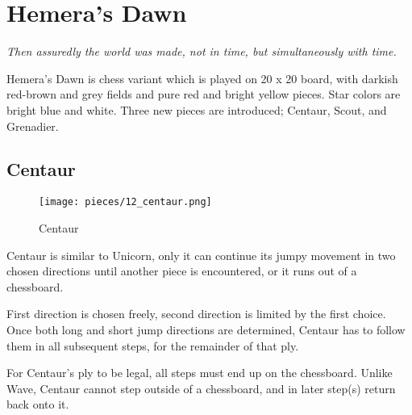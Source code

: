 

\chapter*{Hemera's Dawn}
\label{ch:Hemera's Dawn}

\begin{flushright}
\parbox{0.8\textwidth}{
\emph{Then assuredly the world was made, not in time, but simultaneously with time.\newline
{} } }
\end{flushright}

\noindent
Hemera's Dawn is chess variant which is played on 20 x 20 board, with
darkish red-brown and grey fields and pure red and bright yellow pieces.
Star colors are bright blue and white.
Three new pieces are introduced; Centaur, Scout, and Grenadier.

\clearpage %

\section*{Centaur}
\label{sec:Hemera's Dawn/Centaur}

\noindent
\begin{wrapfigure}[12]{l}{0.4\textwidth}
\centering
\texttt{[image: pieces/12\_centaur.png]}
\caption{Centaur}
\label{fig:12_centaur}
\end{wrapfigure}
Centaur is similar to Unicorn, only it can continue its jumpy movement
in two chosen directions until another piece is encountered, or it runs
out of a chessboard.

First direction is chosen freely, second direction is limited by the first
choice. Once both long and short jump directions are determined, Centaur
has to follow them in all subsequent steps, for the remainder of that ply.

For Centaur's ply to be legal, all steps must end up on the chessboard.
Unlike Wave, Centaur cannot step outside of a chessboard, and in later
step(s) return back onto it.

